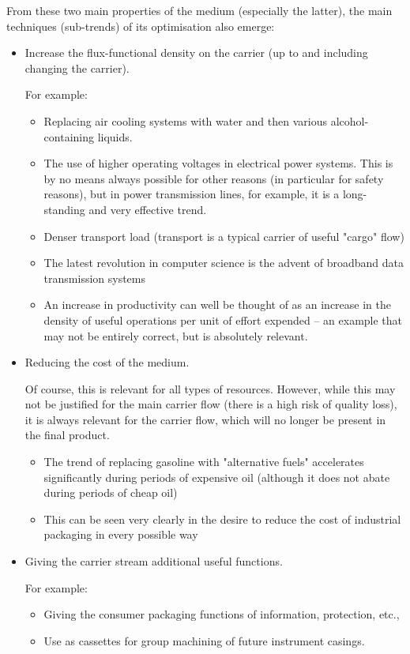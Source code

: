 \documentclass[a4paper,11pt]{article}
\begin{document}
From these two main properties of the medium (especially the latter), the main
techniques (sub-trends) of its optimisation also emerge:
\begin{itemize}
\item Increase the flux-functional density on the carrier (up to and including
  changing the carrier).

  For example:
  \begin{itemize}
  \item Replacing air cooling systems with water and then various
    alcohol-containing liquids.
  \item The use of higher operating voltages in electrical power systems. This
    is by no means always possible for other reasons (in particular for safety
    reasons), but in power transmission lines, for example, it is a
    long-standing and very effective trend.
  \item Denser transport load (transport is a typical carrier of useful
    "cargo" flow)
  \item The latest revolution in computer science is the advent of broadband
    data transmission systems
  \item An increase in productivity can well be thought of as an increase in
    the density of useful operations per unit of effort expended -- an example
    that may not be entirely correct, but is absolutely relevant.
  \end{itemize}
\item Reducing the cost of the medium.

  Of course, this is relevant for all types of resources. However, while this
  may not be justified for the main carrier flow (there is a high risk of
  quality loss), it is always relevant for the carrier flow, which will no
  longer be present in the final product.
  \begin{itemize}
  \item The trend of replacing gasoline with "alternative fuels" accelerates
    significantly during periods of expensive oil (although it does not abate
    during periods of cheap oil)
  \item This can be seen very clearly in the desire to reduce the cost of
    industrial packaging in every possible way
  \end{itemize}
\item Giving the carrier stream additional useful functions.

  For example:
  \begin{itemize}
  \item Giving the consumer packaging functions of information, protection,
    etc.,
  \item Use as cassettes for group machining of future instrument casings.
  \end{itemize}
\end{itemize}
\end{document}
